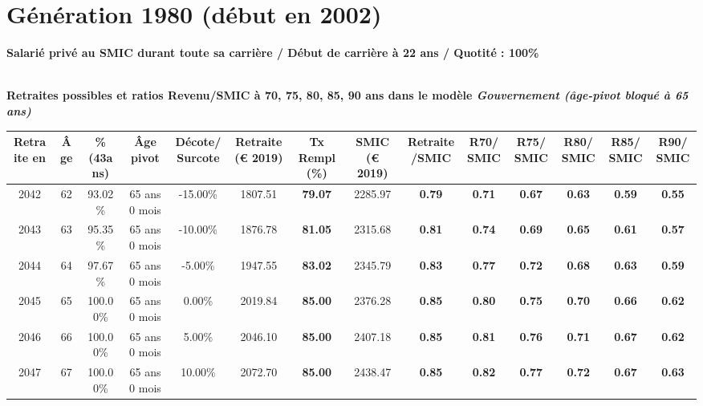 \newpage 
 
\section{Génération 1980 (début en 2002)\label{SMIC_100_1980_22_0}} 
 
{\bf \noindent Salarié privé au SMIC durant toute sa carrière / Début de carrière à 22 ans / Quotité : 100\%}  ~ 

 ~\\{\bf \noindent Retraites possibles et ratios Revenu/SMIC à 70, 75, 80, 85, 90 ans dans le modèle \emph{Gouvernement (âge-pivot bloqué à 65 ans)}}  
 
\begin{adjustbox}{max width=\textwidth} 
\begin{tabular}[htb]{|c|c||c|c|c||c|c||c|c||c|c|c|c|c|} 
\hline 
 Retraite en &  Âge &  \%(43ans) &  Âge pivot &  Décote/Surcote &  Retraite (\euro{} 2019) &  Tx Rempl(\%) &  SMIC (\euro{} 2019) &  Retraite/SMIC &  R70/SMIC &  R75/SMIC &  R80/SMIC &  R85/SMIC &  R90/SMIC \\ 
\hline \hline 
 2042 &  62 &  93.02\% &  65 ans 0 mois &  -15.00\% &  1807.51 &  {\bf 79.07} &  2285.97 &  {\bf {\color{red} 0.79}} &  {\bf {\color{red} 0.71}} &  {\bf {\color{red} 0.67}} &  {\bf {\color{red} 0.63}} &  {\bf {\color{red} 0.59}} &  {\bf {\color{red} 0.55}} \\ 
\hline 
 2043 &  63 &  95.35\% &  65 ans 0 mois &  -10.00\% &  1876.78 &  {\bf 81.05} &  2315.68 &  {\bf {\color{red} 0.81}} &  {\bf {\color{red} 0.74}} &  {\bf {\color{red} 0.69}} &  {\bf {\color{red} 0.65}} &  {\bf {\color{red} 0.61}} &  {\bf {\color{red} 0.57}} \\ 
\hline 
 2044 &  64 &  97.67\% &  65 ans 0 mois &  -5.00\% &  1947.55 &  {\bf 83.02} &  2345.79 &  {\bf {\color{red} 0.83}} &  {\bf {\color{red} 0.77}} &  {\bf {\color{red} 0.72}} &  {\bf {\color{red} 0.68}} &  {\bf {\color{red} 0.63}} &  {\bf {\color{red} 0.59}} \\ 
\hline 
 2045 &  65 &  100.00\% &  65 ans 0 mois &  0.00\% &  2019.84 &  {\bf 85.00} &  2376.28 &  {\bf {\color{red} 0.85}} &  {\bf {\color{red} 0.80}} &  {\bf {\color{red} 0.75}} &  {\bf {\color{red} 0.70}} &  {\bf {\color{red} 0.66}} &  {\bf {\color{red} 0.62}} \\ 
\hline 
 2046 &  66 &  100.00\% &  65 ans 0 mois &  5.00\% &  2046.10 &  {\bf 85.00} &  2407.18 &  {\bf {\color{red} 0.85}} &  {\bf {\color{red} 0.81}} &  {\bf {\color{red} 0.76}} &  {\bf {\color{red} 0.71}} &  {\bf {\color{red} 0.67}} &  {\bf {\color{red} 0.62}} \\ 
\hline 
 2047 &  67 &  100.00\% &  65 ans 0 mois &  10.00\% &  2072.70 &  {\bf 85.00} &  2438.47 &  {\bf {\color{red} 0.85}} &  {\bf {\color{red} 0.82}} &  {\bf {\color{red} 0.77}} &  {\bf {\color{red} 0.72}} &  {\bf {\color{red} 0.67}} &  {\bf {\color{red} 0.63}} \\ 
\hline 
\hline 
\end{tabular} 
\end{adjustbox} 
 
